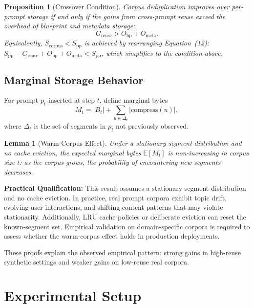 \documentclass[10pt,conference]{IEEEtran}
\newtheorem{proposition}{Proposition}
\newtheorem{lemma}{Lemma}
\begin{document}
\begin{proposition}[Crossover Condition]
Corpus deduplication improves over per-prompt storage if and only if the gains from cross-prompt reuse exceed the overhead of blueprint and metadata storage:
\begin{equation}
G_{\text{reuse}} > O_{\text{bp}} + O_{\text{meta}}.
\end{equation}
Equivalently, $S_{\text{corpus}} < S_{\text{pp}}$ is achieved by rearranging Equation~(12): $S_{\text{pp}} - G_{\text{reuse}} + O_{\text{bp}} + O_{\text{meta}} < S_{\text{pp}}$, which simplifies to the condition above.
\end{proposition}

\subsection{Marginal Storage Behavior}
For prompt $p_t$ inserted at step $t$, define marginal bytes
\begin{equation}
M_t = |B_t| + \sum_{u\in \Delta_t}|\text{compress}(u)|,
\end{equation}
where $\Delta_t$ is the set of segments in $p_t$ not previously observed.

\begin{lemma}[Warm-Corpus Effect]
Under a stationary segment distribution and no cache eviction, the expected marginal bytes $\mathbb{E}[M_t]$ is non-increasing in corpus size $t$: as the corpus grows, the probability of encountering new segments decreases.
\end{lemma}

\textbf{Practical Qualification:} This result assumes a stationary segment distribution and no cache eviction. In practice, real prompt corpora exhibit topic drift, evolving user interactions, and shifting content patterns that may violate stationarity. Additionally, LRU cache policies or deliberate eviction can reset the known-segment set. Empirical validation on domain-specific corpora is required to assess whether the warm-corpus effect holds in production deployments.

These proofs explain the observed empirical pattern: strong gains in high-reuse synthetic settings and weaker gains on low-reuse real corpora.

\section{Experimental Setup}
\end{document}
